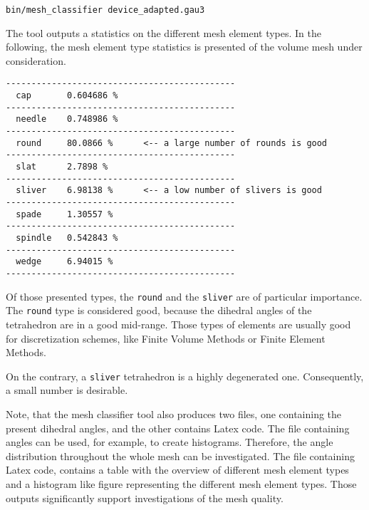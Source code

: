 \begin{exaipd}
\begin{Verbatim}
bin/mesh_classifier device_adapted.gau3
\end{Verbatim}
\end{exaipd}

The tool outputs a statistics on the different mesh element types. 
In the following, the mesh element type statistics is presented of 
the volume mesh under consideration.

\begin{exaipd}
\begin{Verbatim}
---------------------------------------------
  cap       0.604686 %
---------------------------------------------
  needle    0.748986 %
---------------------------------------------
  round     80.0866 %      <-- a large number of rounds is good
---------------------------------------------
  slat      2.7898 %
---------------------------------------------
  sliver    6.98138 %      <-- a low number of slivers is good
---------------------------------------------
  spade     1.30557 %
---------------------------------------------
  spindle   0.542843 %
---------------------------------------------
  wedge     6.94015 %
---------------------------------------------
\end{Verbatim}
\end{exaipd}

Of those presented types, the \texttt{round} and the \texttt{sliver} 
are of particular importance. The \texttt{round} type is considered good, 
because the dihedral angles of the tetrahedron are in a good mid-range. 
Those types of elements are usually good for discretization schemes, like 
Finite Volume Methods or Finite Element Methods.  

On the contrary, a \texttt{sliver} tetrahedron is a highly degenerated one. 
Consequently, a small number is desirable.

Note, that the mesh classifier tool also produces two files, one containing 
the present dihedral angles, and the other contains Latex code. 
The file containing angles can be used, for example, to create histograms.
Therefore, the angle distribution throughout the whole mesh can be investigated.
The file containing Latex code, contains a table with the overview of different 
mesh element types and a histogram like figure representing the different mesh 
element types. 
Those outputs significantly support investigations of the mesh quality.


